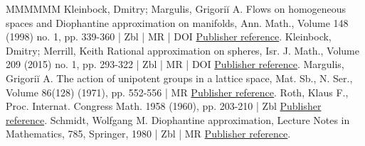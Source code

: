 \begin{thebibliography}{MMMMMM}
 Kleinbock, Dmitry; Margulis, Grigoriĭ A. Flows on homogeneous spaces and Diophantine approximation on manifolds, Ann. Math., Volume 148 (1998) no. 1, pp. 339-360 | Zbl | MR | DOI \href{https://ahl.centre-mersenne.org/item/AHL_2022__5__1009_0/#kleinbockmargulis}{Publisher reference}.
 Kleinbock, Dmitry; Merrill, Keith Rational approximation on spheres, Isr. J. Math., Volume 209 (2015) no. 1, pp. 293-322 | Zbl | MR | DOI \href{https://ahl.centre-mersenne.org/item/AHL_2022__5__1009_0/#kleinbock-merrill}{Publisher reference}.
 Margulis, Grigoriĭ A. The action of unipotent groups in a lattice space, Mat. Sb., N. Ser., Volume 86(128) (1971), pp. 552-556 | MR \href{https://ahl.centre-mersenne.org/item/AHL_2022__5__1009_0/#margulis_}{Publisher reference}.
 Roth, Klaus F., Proc. Internat. Congress Math. 1958 (1960), pp. 203-210 | Zbl \href{https://ahl.centre-mersenne.org/item/AHL_2022__5__1009_0/#roth}{Publisher reference}.
 Schmidt, Wolfgang M. Diophantine approximation, Lecture Notes in Mathematics, 785, Springer, 1980 | Zbl | MR \href{https://ahl.centre-mersenne.org/item/AHL_2022__5__1009_0/#schmidt_da}{Publisher reference}.
\end{thebibliography}
